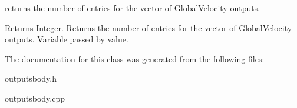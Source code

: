 returns the number of entries for the vector of \hyperlink{classosea_1_1ofreq_1_1_global_velocity}{Global\-Velocity} outputs. 

\begin{DoxyReturn}{Returns}
Integer. Returns the number of entries for the vector of \hyperlink{classosea_1_1ofreq_1_1_global_velocity}{Global\-Velocity} outputs. Variable passed by value. 
\end{DoxyReturn}


The documentation for this class was generated from the following files\-:\begin{DoxyCompactItemize}
\item 
outputsbody.\-h\item 
outputsbody.\-cpp\end{DoxyCompactItemize}
